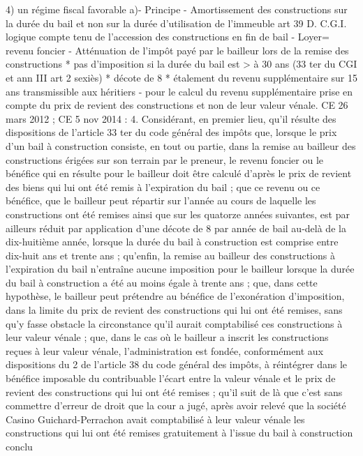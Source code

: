 \documentclass[11pt,a4paper]{report}
\begin{document}
	4) un régime fiscal favorable
	a)- Principe
	- Amortissement des constructions sur la durée du bail et non sur la durée d’utilisation de l’immeuble art 39 D.
	C.G.I. logique compte tenu de l’accession des constructions en fin de bail
	- Loyer= revenu foncier
	- Atténuation de l’impôt payé par le bailleur lors de la remise des constructions
	* pas d’imposition si la durée du bail est > à 30 ans (33 ter du CGI et ann III art 2 sexiès)
	* décote de 8%
	* étalement du revenu supplémentaire sur 15 ans transmissible aux héritiers
	- pour le calcul du revenu supplémentaire prise en compte du prix de revient des constructions et non de leur
	valeur vénale.
	CE 26 mars 2012  ; CE 5 nov 2014  :
	4. Considérant, en premier lieu, qu'il résulte des dispositions de l'article 33 ter du code général des impôts que,
	lorsque le prix d'un bail à construction consiste, en tout ou partie, dans la remise au bailleur des constructions
	érigées sur son terrain par le preneur, le revenu foncier ou le bénéfice qui en résulte pour le bailleur doit être
	calculé d'après le prix de revient des biens qui lui ont été remis à l'expiration du bail ; que ce revenu ou ce
	bénéfice, que le bailleur peut répartir sur l'année au cours de laquelle les constructions ont été remises ainsi que
	sur les quatorze années suivantes, est par ailleurs réduit par application d'une décote de 8 %
	par année de bail au-delà de la dix-huitième année, lorsque la durée du bail à construction est comprise entre
	dix-huit ans et trente ans ; qu'enfin, la remise au bailleur des constructions à l'expiration du bail n'entraîne
	aucune imposition pour le bailleur lorsque la durée du bail à construction a été au moins égale à trente ans ;
	que, dans cette hypothèse, le bailleur peut prétendre au bénéfice de l'exonération d'imposition, dans la limite du
	prix de revient des constructions qui lui ont été remises, sans qu'y fasse obstacle la circonstance qu'il aurait
	comptabilisé ces constructions à leur valeur vénale ; que, dans le cas où le bailleur a inscrit les constructions
	reçues à leur valeur vénale, l'administration est fondée, conformément aux dispositions du 2 de l'article 38 du
	code général des impôts, à réintégrer dans le bénéfice imposable du contribuable l'écart entre la valeur vénale
	et le prix de revient des constructions qui lui ont été remises ; qu'il suit de là que c'est sans commettre d'erreur
	de droit que la cour a jugé, après avoir relevé que la société Casino Guichard-Perrachon avait comptabilisé à
	leur valeur vénale les constructions qui lui ont été remises gratuitement à l'issue du bail à construction conclu
\end{document}
